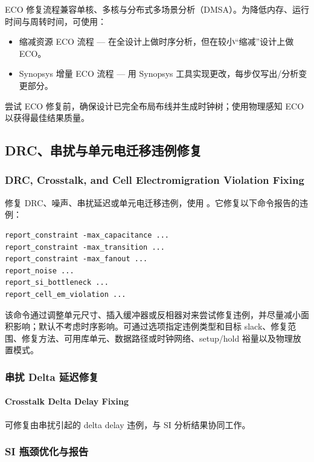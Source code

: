 ECO 修复流程兼容单核、多核与分布式多场景分析（DMSA）。为降低内存、运行时间与周转时间，可使用：
\begin{itemize}
  \item 缩减资源 ECO 流程 — 在全设计上做时序分析，但在较小“缩减”设计上做 ECO。
  \item Synopsys 增量 ECO 流程 — 用 Synopsys 工具实现更改，每步仅写出/分析变更部分。
\end{itemize}

\begin{noteBox}
尝试 ECO 修复前，确保设计已完全布局布线并生成时钟树；使用物理感知 ECO 以获得最佳结果质量。
\end{noteBox}

\subsection{DRC、串扰与单元电迁移违例修复}
\subsubsection*{DRC, Crosstalk, and Cell Electromigration Violation Fixing}

修复 DRC、噪声、串扰延迟或单元电迁移违例，使用 。它修复以下命令报告的违例：
\begin{lstlisting}
report_constraint -max_capacitance ...
report_constraint -max_transition ...
report_constraint -max_fanout ...
report_noise ...
report_si_bottleneck ...
report_cell_em_violation ...
\end{lstlisting}

该命令通过调整单元尺寸、插入缓冲器或反相器对来尝试修复违例，并尽量减小面积影响；默认不考虑时序影响。可通过选项指定违例类型和目标 slack、修复范围、修复方法、可用库单元、数据路径或时钟网络、setup/hold 裕量以及物理放置模式。

\subsubsection{串扰 Delta 延迟修复}
\paragraph*{Crosstalk Delta Delay Fixing}

 可修复由串扰引起的 delta delay 违例，与 SI 分析结果协同工作。

\subsubsection{SI 瓶颈优化与报告}
